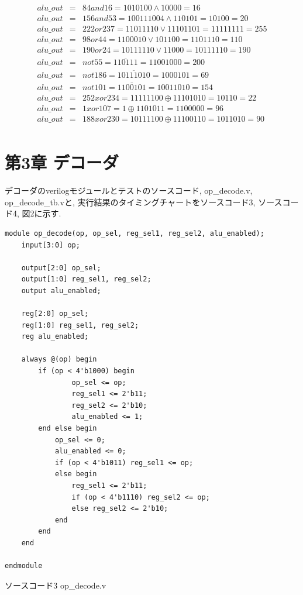 \documentclass[12pt]{jreport}
\begin{document}
\begin{itemize}
\begin{eqnarray*}
                alu\_out &=& 84 and 16 = 1010100 \wedge 10000 = 16\\
                alu\_out &=& 156 and 53 = 100111004 \wedge 110101 = 10100 = 20\\
                alu\_out &=& 222 or 237 = 11011110 \vee 11101101 = 11111111 = 255\\
                alu\_out &=& 98 or 44 = 1100010 \vee 101100 = 1101110 = 110\\
                alu\_out &=& 190 or 24 = 10111110 \vee 11000 = 10111110 = 190\\
                alu\_out &=& not 55 = \overline{110111} = 11001000 = 200\\
                alu\_out &=& not 186 = \overline{10111010} = 1000101 = 69\\
                alu\_out &=& not 101 = \overline{1100101} = 10011010 = 154\\
                alu\_out &=& 252 xor 234 = 11111100 \oplus 11101010 = 10110 = 22\\
                alu\_out &=& 1 xor 107 = 1 \oplus 1101011 = 1100000 = 96\\
                alu\_out &=& 188 xor 230 = 10111100 \oplus 11100110 = 1011010 = 90\\
            \end{eqnarray*}

        \end{itemize}

    \chapter*{第3章 デコーダ}
        デコーダのverilogモジュールとテストのソースコード, op\_decode.v, op\_decode\_tb.vと, 実行結果のタイミングチャートをソースコード3, ソースコード4, 図2に示す. 
        \begin{center}
            \begin{lstlisting}[basicstyle=\ttfamily\footnotesize, frame=single]
module op_decode(op, op_sel, reg_sel1, reg_sel2, alu_enabled);
    input[3:0] op;
    
    output[2:0] op_sel;
    output[1:0] reg_sel1, reg_sel2;
    output alu_enabled;
    
    reg[2:0] op_sel;
    reg[1:0] reg_sel1, reg_sel2;
    reg alu_enabled;
    
    always @(op) begin
        if (op < 4'b1000) begin
                op_sel <= op;
                reg_sel1 <= 2'b11;
                reg_sel2 <= 2'b10;
                alu_enabled <= 1;
        end else begin
            op_sel <= 0;
            alu_enabled <= 0;
            if (op < 4'b1011) reg_sel1 <= op;
            else begin
                reg_sel1 <= 2'b11;
                if (op < 4'b1110) reg_sel2 <= op;
                else reg_sel2 <= 2'b10;
            end
        end
    end
    
endmodule
            \end{lstlisting}
            ソースコード3 op\_decode.v
        \end{center}
        \newpage
\end{document}
